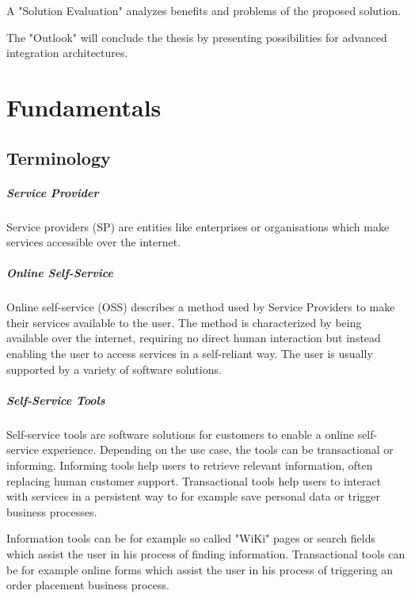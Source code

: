 \documentclass[
     12pt,         %
     a4paper,      %
     BCOR=10mm,version=first,     %
     DIV=14,version=first,        %
     ]{scrreprt}
\begin{document}
A "Solution Evaluation" analyzes benefits and problems of the proposed solution.

The "Outlook" will conclude the thesis by presenting possibilities for advanced integration architectures.

\chapter{Fundamentals}

\section{Terminology}

\paragraph{Service Provider}
Service providers (SP) are entities like enterprises or organisations which make services accessible over the internet.

\paragraph{Online Self-Service}
Online self-service (OSS) describes a method used by Service Providers to make their services available to the user. The method is characterized by being available over the internet, requiring no direct human interaction but instead enabling the user to access services in a self-reliant way. The user is usually supported by a variety of software solutions.

\paragraph{Self-Service Tools}
Self-service tools are software solutions for customers to enable a online self-service experience. Depending on the use case, the tools can be transactional or informing. Informing tools help users to retrieve relevant information, often replacing human customer support. Transactional tools help users to interact with services in a persistent way to for example save personal data or trigger business processes.

Information tools can be for example so called "WiKi" pages or search fields which assist the user in his process of finding information. Transactional tools can be for example online forms which assist the user in his process of triggering an order placement business process.
\end{document}
